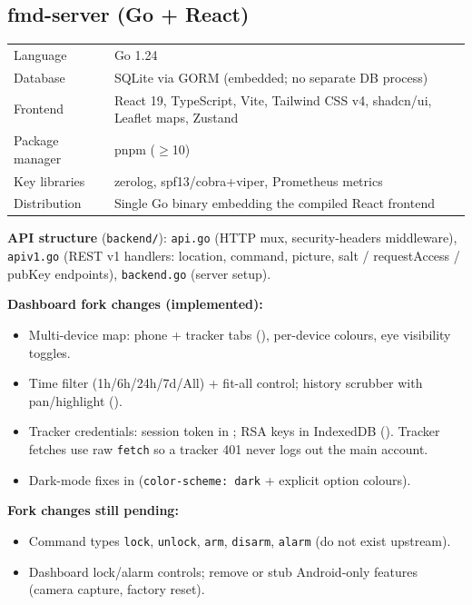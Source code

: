 \documentclass[11pt,a4paper]{article}
\begin{document}
\subsection{fmd-server (Go + React)}

\begin{table}[h]
\small
\begin{tabularx}{\textwidth}{lL}
\toprule
Language & Go 1.24\\
Database & SQLite via GORM (embedded; no separate DB process)\\
Frontend & React 19, TypeScript, Vite, Tailwind CSS v4, shadcn/ui, Leaflet maps, Zustand\\
Package manager & pnpm ($\geq$10)\\
Key libraries & zerolog, spf13/cobra+viper, Prometheus metrics\\
Distribution & Single Go binary embedding the compiled React frontend\\
\bottomrule
\end{tabularx}
\end{table}

\textbf{API structure} (\texttt{backend/}): \texttt{api.go} (HTTP mux, security-headers middleware), \texttt{apiv1.go} (REST v1 handlers: location, command, picture, salt / requestAccess / pubKey endpoints), \texttt{backend.go} (server setup).

\textbf{Dashboard fork changes (implemented):}
\begin{itemize}
  \item Multi-device map: phone + tracker tabs (), per-device colours, eye visibility toggles.
  \item Time filter (1h/6h/24h/7d/All) + fit-all control; history scrubber with pan/highlight ().
  \item Tracker credentials: session token in ; RSA keys in IndexedDB (). Tracker fetches use raw \texttt{fetch} so a tracker 401 never logs out the main account.
  \item Dark-mode fixes in  (\texttt{color-scheme: dark} + explicit option colours).
\end{itemize}

\textbf{Fork changes still pending:}
\begin{itemize}
  \item Command types \texttt{lock}, \texttt{unlock}, \texttt{arm}, \texttt{disarm}, \texttt{alarm} (do not exist upstream).
  \item Dashboard lock/alarm controls; remove or stub Android-only features (camera capture, factory reset).
\end{itemize}
\end{document}
